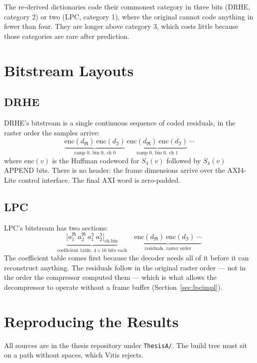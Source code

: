 \noindent
The re-derived dictionaries code their commonest category in three bits (DRHE,
category 2) or two (LPC, category 1), where the original cannot code anything
in fewer than four. They are longer above category 3, which costs little
because those categories are rare after prediction.

\chapter{Bitstream Layouts}
\label{app:bitstream}

\section{DRHE}

DRHE's bitstream is a single continuous sequence of coded residuals, in the
raster order the samples arrive:
\[
\underbrace{\text{enc}(d_{\Re})\ \text{enc}(d_{\Im})}_{\text{ramp }0,\ \text{bin }0,\ \text{ch }0}\
\underbrace{\text{enc}(d_{\Re})\ \text{enc}(d_{\Im})}_{\text{ramp }0,\ \text{bin }0,\ \text{ch }1}\
\cdots
\]
where $\text{enc}(v)$ is the Huffman codeword for $S_4(v)$ followed by
$S_4(v)$ APPEND bits. There is no header: the frame dimensions arrive over the
AXI4-Lite control interface. The final AXI word is zero-padded.

\section{LPC}

LPC's bitstream has two sections:
\[
\underbrace{\big[a_1^{\Re}\ a_2^{\Re}\ a_1^{\Im}\ a_2^{\Im}\big]_{\text{ch},\text{bin}}}_{\text{coefficient table, }4\times16\text{ bits each}}
\quad
\underbrace{\text{enc}(d_{\Re})\ \text{enc}(d_{\Im})\ \cdots}_{\text{residuals, raster order}}
\]
The coefficient table comes first because the decoder needs all of it before it
can reconstruct anything. The residuals follow in the original raster order ---
not in the order the compressor computed them --- which is what allows the
decompressor to operate without a frame buffer
(Section~\ref{sec:lpcimpl}).


\chapter{Reproducing the Results}
\label{app:repro}

All sources are in the thesis repository under \texttt{ThesisA/}. The build
tree must sit on a path without spaces, which Vitis rejects.

